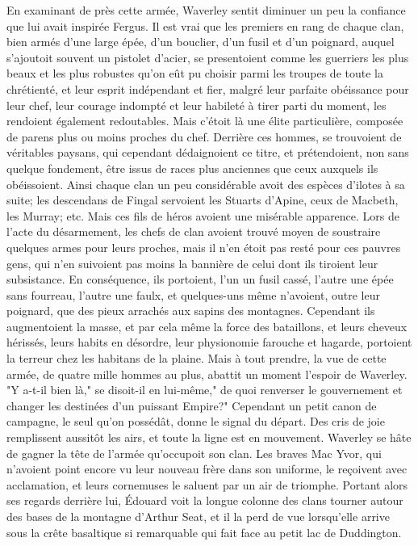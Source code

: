 En examinant de près cette armée, Waverley sentit diminuer un peu la confiance que lui avait inspirée Fergus. Il est vrai que les premiers en rang de chaque clan, bien armés d'une large épée, d'un bouclier, d'un fusil et d'un poignard, auquel s'ajoutoit souvent un pistolet d'acier, se presentoient\setcounter{page}{234} comme les guerriers les plus beaux et les plus robustes qu’on eût pu choisir parmi les troupes de toute la chrétienté, et leur esprit indépendant et fier, malgré leur parfaite obéissance pour leur chef, leur courage indompté et leur habileté à tirer parti du moment, les rendoient également redoutables. Mais c’étoit là une élite particulière, composée de parens plus ou moins proches du chef. Derrière ces hommes, se trouvoient de véritables paysans, qui cependant dédaignoient ce titre, et prétendoient, non sans quelque fondement, être issus de races plus anciennes que ceux auxquels ils obéissoient. Ainsi chaque clan un peu considérable avoit des espèces d’ilotes à sa suite; les descendans de Fingal servoient les Stuarts d’Apine, ceux de Macbeth, les Murray; etc. Mais ces fils de héros avoient une misérable apparence. Lors de l’acte du désarmement, les chefs de clan avoient trouvé moyen de soustraire quelques armes pour leurs proches, mais il n’en étoit pas resté pour ces pauvres gens, qui n’en suivoient pas moins la bannière de celui dont ils tiroient leur subsistance. En conséquence, ils portoient, l’un un fusil cassé, l’autre une épée sans fourreau, l’autre une faulx, et quelques-uns même n’avoient, outre leur poignard, que des pieux arrachés aux sapins\setcounter{page}{235} des montagnes. Cependant ils augmentoient la masse, et par cela même la force des bataillons, et leurs cheveux hérissés, leurs habits en désordre, leur physionomie farouche et hagarde, portoient la terreur chez les habitans de la plaine. Mais à tout prendre, la vue de cette armée, de quatre mille hommes au plus, abattit un moment l'espoir de Waverley. "Y a-t-il bien là," se disoit-il en lui-même," de quoi renverser le gouvernement et changer les destinées d'un puissant Empire?"
Cependant un petit canon de campagne, le seul qu'on possédât, donne le signal du départ. Des cris de joie remplissent aussitôt les airs, et toute la ligne est en mouvement. Waverley se hâte de gagner la tête de l'armée qu'occupoit son clan. Les braves Mac Yvor, qui n'avoient point encore vu leur nouveau frère dans son uniforme, le reçoivent avec acclamation, et leurs cornemuses le saluent par un air de triomphe. Portant alors ses regards derrière lui, Édouard voit la longue colonne des clans tourner autour des bases de la montagne d'Arthur Seat, et il la perd de vue lorsqu'elle arrive sous la crête basaltique si remarquable qui fait face au petit lac de Duddington.
